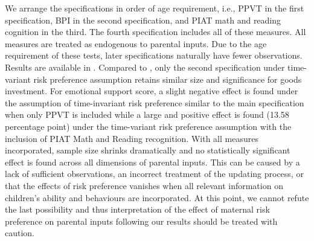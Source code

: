 \documentclass[emulatestandardclasses, 10pt, abstract = true]{scrartcl}
\begin{document}
We arrange the specifications in order of age requirement, i.e., PPVT in the first specification, BPI in the second specification, and PIAT math and reading cognition in the third. The fourth specification includes all of these measures. All measures are treated as endogenous to parental inputs. Due to the age requirement of these tests, later specifications naturally have fewer observations. Results are available in . Compared to , only the second specification under time-variant risk preference assumption retains similar size and significance for goods investment. For emotional support score, a slight negative effect is found under the assumption of time-invariant risk preference similar to the main specification when only PPVT is included while a large and positive effect is found (13.58 percentage point) under the time-variant risk preference assumption with the inclusion of PIAT Math and Reading recognition. With all measures incorporated, sample size shrinks dramatically and no statistically significant effect is found across all dimensions of parental inputs. This can be caused by a lack of sufficient observations, an incorrect treatment of the updating process, or that the effects of risk preference vanishes when all relevant information on children's ability and behaviours are incorporated. At this point, we cannot refute the last possibility and thus interpretation of the effect of maternal risk preference on parental inputs following our results should be treated with caution.





\end{document}
